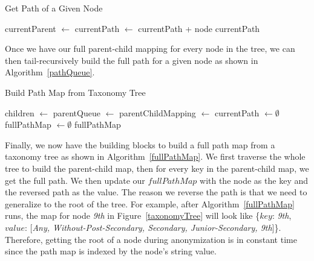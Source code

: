 \documentclass[11pt]{article}       %
\begin{document}
\begin{algorithm}[h]
\label{pathQueue}
\caption{Get Path of a Given Node}
\BlankLine
{} {
  \BlankLine
  currentParent $\leftarrow$ \;
  currentPath $\leftarrow$ currentPath + node\;
   {
    \KwRet currentPath\;
  } {
    \KwRet {}\;
  }
}
\end{algorithm}

Once we have our full parent-child mapping for every node in the tree, we can then tail-recursively build the full path for a given node as shown in Algorithm~\ref{pathQueue}. 

\begin{algorithm}[h]
\label{fullPathMap}
\caption{Build Path Map from Taxonomy Tree}
\BlankLine
children $\leftarrow$ \;
parentQueue $\leftarrow$ 
\BlankLine
parentChildMapping $\leftarrow$ \;
currentPath $\leftarrow \emptyset$\;
fullPathMap $\leftarrow \emptyset$\;
\BlankLine
{}
\BlankLine
\KwRet fullPathMap

\end{algorithm}

Finally, we now have the building blocks to build a full path map from a taxonomy tree as shown in Algorithm~\ref{fullPathMap}. We first traverse the whole tree to build the parent-child map, then for every key in the parent-child map, we get the full path. We then update our $fullPathMap$ with the node as the key and the reversed path as the value. The reason we reverse the path is that we need to generalize to the root of the tree. For example, after Algorithm~\ref{fullPathMap} runs, the map for node \emph{9th} in Figure~\ref{taxonomyTree} will look like \{$key$: \emph{9th}, $value$: [\emph{Any, Without-Post-Secondary, Secondary, Junior-Secondary, 9th}]\}. Therefore, getting the root of a node during anonymization is in constant time since the path map is indexed by the node's string value.
\end{document}
